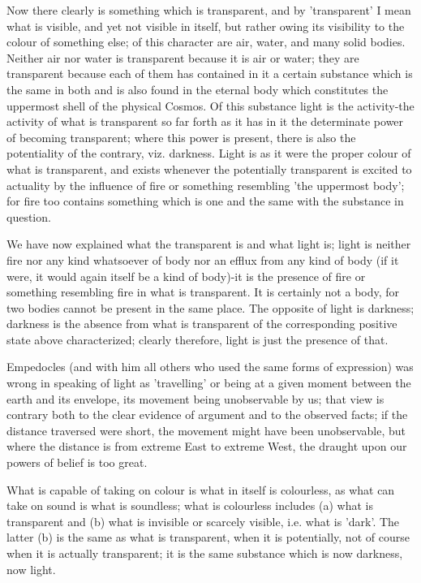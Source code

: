 Now there clearly is something which is transparent, and by 'transparent'
I mean what is visible, and yet not visible in itself, but rather
owing its visibility to the colour of something else; of this character
are air, water, and many solid bodies. Neither air nor water is transparent
because it is air or water; they are transparent because each of them
has contained in it a certain substance which is the same in both
and is also found in the eternal body which constitutes the uppermost
shell of the physical Cosmos. Of this substance light is the activity-the
activity of what is transparent so far forth as it has in it the determinate
power of becoming transparent; where this power is present, there
is also the potentiality of the contrary, viz. darkness. Light is
as it were the proper colour of what is transparent, and exists whenever
the potentially transparent is excited to actuality by the influence
of fire or something resembling 'the uppermost body'; for fire too
contains something which is one and the same with the substance in
question. 

We have now explained what the transparent is and what light is; light
is neither fire nor any kind whatsoever of body nor an efflux from
any kind of body (if it were, it would again itself be a kind of body)-it
is the presence of fire or something resembling fire in what is transparent.
It is certainly not a body, for two bodies cannot be present in the
same place. The opposite of light is darkness; darkness is the absence
from what is transparent of the corresponding positive state above
characterized; clearly therefore, light is just the presence of that.

Empedocles (and with him all others who used the same forms of expression)
was wrong in speaking of light as 'travelling' or being at a given
moment between the earth and its envelope, its movement being unobservable
by us; that view is contrary both to the clear evidence of argument
and to the observed facts; if the distance traversed were short, the
movement might have been unobservable, but where the distance is from
extreme East to extreme West, the draught upon our powers of belief
is too great. 

What is capable of taking on colour is what in itself is colourless,
as what can take on sound is what is soundless; what is colourless
includes (a) what is transparent and (b) what is invisible or scarcely
visible, i.e. what is 'dark'. The latter (b) is the same as what is
transparent, when it is potentially, not of course when it is actually
transparent; it is the same substance which is now darkness, now light.

